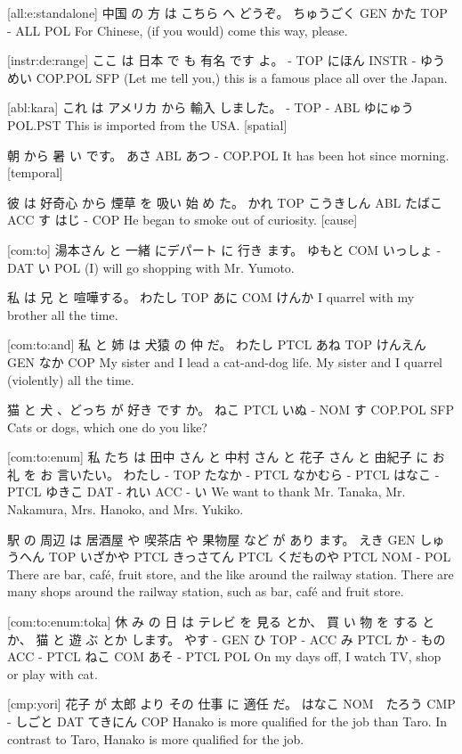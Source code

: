 [all:e:standalone]
中国      の  方    は こちら へ どうぞ。
ちゅうごく GEN かた TOP -    ALL POL
For Chinese, (if you would) come this way, please.

[instr:de:range]
ここ は  日本    で   も  有名    です   よ。
-   TOP にほん INSTR - ゆうめい COP.POL SFP
(Let me tell you,) this is a famous place all over the Japan.

[abl:kara]
これ は アメリカ から 輸入 しました。
-  TOP -      ABL ゆにゅう POL.PST
This is imported from the USA. [spatial]

朝  から  暑 い   です。
あさ ABL あつ - COP.POL
It has been hot since morning. [temporal]

彼   は  好奇心    から 煙草   を  吸い 始 め た。
かれ TOP こうきしん ABL たばこ ACC す  はじ - COP
He began to smoke out of curiosity. [cause]

[com:to]
湯本さん と  一緒 にデパート に 行き ます。
ゆもと  COM いっしょ -    DAT い  POL
(I) will go shopping with Mr. Yumoto.

私     は  兄  と  喧嘩する。
わたし TOP あに COM けんか
I quarrel with my brother all the time.

[com:to:and]
私     と   姉   は   犬猿   の  仲   だ。
わたし PTCL あね TOP けんえん GEN なか COP
My sister and I lead a cat-and-dog life.
My sister and I quarrel (violently) all the time.

猫    と  犬 、どっち が 好き です    か。
ねこ PTCL いぬ -     NOM す COP.POL SFP
Cats or dogs, which one do you like?

[com:to:enum]
私 たち  は  田中 さん と   中村 さん  と    花子 さん と  由紀子 に  お 礼   を お 言いたい。
わたし - TOP たなか - PTCL なかむら - PTCL はなこ - PTCL ゆきこ DAT - れい ACC - い
We want to thank Mr. Tanaka, Mr. Nakamura, Mrs. Hanoko, and Mrs. Yukiko.

駅   の  周辺       は 居酒屋    や    喫茶店   や     果物屋  など  が  あり ます。
えき GEN しゅうへん TOP いざかや PTCL きっさてん PTCL くだものや PTCL NOM -   POL
There are bar, café, fruit store, and the like around the railway station.
There are many shops around the railway station, such as bar, café and fruit store.

[com:to:enum:toka]
休  み の  日  は テレビ を 見る とか、 買 い 物  を する とか、 猫  と  遊  ぶ とか します。
やす - GEN ひ TOP -   ACC み  PTCL  か - もの ACC -  PTCL ねこ COM あそ - PTCL POL
On my days off, I watch TV, shop or play with cat.

[cmp:yori]
花子   が   太郎 より その 仕事  に  適任    だ。
はなこ NOM　たろう CMP - しごと DAT てきにん COP
Hanako is more qualified for the job than Taro.
In contrast to Taro, Hanako is more qualified for the job.

